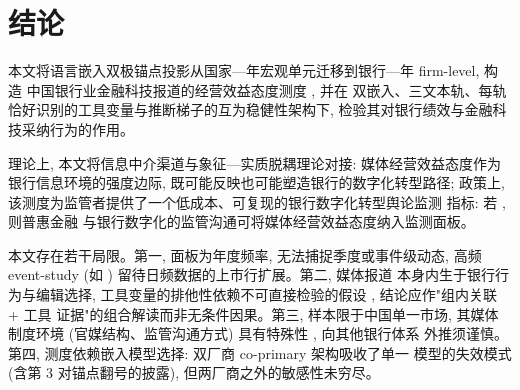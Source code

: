\section{结论}\label{sec:concl}
本文将语言嵌入双极锚点投影从国家—年宏观单元迁移到银行—年 firm-level, 构造
中国银行业金融科技报道的经营效益态度测度 , 并在
双嵌入、三文本轨、每轨恰好识别的工具变量与推断梯子的互为稳健性架构下,
检验其对银行绩效与金融科技采纳行为的作用。

理论上, 本文将信息中介渠道与象征—实质脱耦理论对接: 媒体经营效益态度作为
银行信息环境的强度边际, 既可能反映也可能塑造银行的数字化转型路径;
政策上, 该测度为监管者提供了一个低成本、可复现的银行数字化转型舆论监测
指标: 若 , 则普惠金融
与银行数字化的监管沟通可将媒体经营效益态度纳入监测面板。

本文存在若干局限。第一, 面板为年度频率, 无法捕捉季度或事件级动态, 高频
event-study (如 ) 留待日频数据的上市行扩展。第二, 媒体报道
本身内生于银行行为与编辑选择, 工具变量的排他性依赖不可直接检验的假设
\parencite{manski1993reflection,leary2014peer}, 结论应作"组内关联 + 工具
证据"的组合解读而非无条件因果。第三, 样本限于中国单一市场, 其媒体制度环境
(官媒结构、监管沟通方式) 具有特殊性 \parencite{you2018pen}, 向其他银行体系
外推须谨慎。第四, 测度依赖嵌入模型选择: 双厂商 co-primary 架构吸收了单一
模型的失效模式 (含第 3 对锚点翻号的披露), 但两厂商之外的敏感性未穷尽。

\printbibliography


